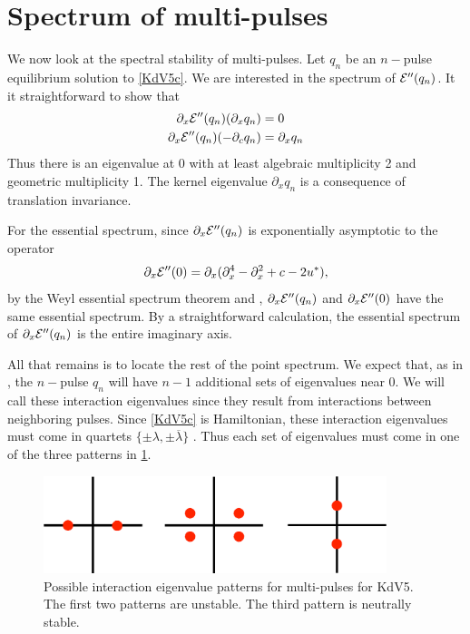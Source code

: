 \documentclass[thesis.tex]{subfiles}
\begin{document}
\section{Spectrum of multi-pulses}

We now look at the spectral stability of multi-pulses. Let $q_n$ be an $n-$pulse equilibrium solution to \cref{KdV5c}. We are interested in the spectrum of $\mathcal{E}''(q_n)$. It it straightforward to show that 
\begin{align*}
\partial_x \mathcal{E}''(q_n) (\partial_x q_n) &= 0 \\
\partial_x \mathcal{E}''(q_n) (-\partial_c q_n) &= \partial_x q_n
\end{align*}
Thus there is an eigenvalue at 0 with at least algebraic multiplicity 2 and geometric multiplicity 1. The kernel eigenvalue $\partial_x q_n$ is a consequence of translation invariance.

For the essential spectrum, since $\partial_x \mathcal{E}''(q_n)$ is exponentially asymptotic to the operator 
\[
\partial_x \mathcal{E}''(0) = 
\partial_x(\partial_x^4 - \partial_x^2 + c - 2 u^*),
\]
by the Weyl essential spectrum theorem \cite[Theorem 2.2.6]{Kapitula2013} and \cite[Theorem 3.1.11]{Kapitula2013}, $\partial_x \mathcal{E}''(q_n)$ and $\partial_x \mathcal{E}''(0)$ have the same essential spectrum. By a straightforward calculation, the essential spectrum of $\partial_x \mathcal{E}''(q_n)$ is the entire imaginary axis.

All that remains is to locate the rest of the point spectrum. We expect that, as in \cite{Sandstede1998}, the $n-$pulse $q_n$ will have $n-1$ additional sets of eigenvalues near 0. We will call these interaction eigenvalues since they result from interactions between neighboring pulses. Since \cref{KdV5c} is Hamiltonian, these interaction eigenvalues must come in quartets $\{ \pm \lambda, \pm \overline{\lambda}\}$ \cite[Proposition 5.1.2]{Kapitula2013}. Thus each set of eigenvalues must come in one of the three patterns in \cref{fig:kdv5inteigpattern}.

\begin{figure}[H]
\includegraphics[width=10cm]{images/kdv5/eigdouble2}
\caption{Possible interaction eigenvalue patterns for multi-pulses for KdV5. The first two patterns are unstable. The third pattern is neutrally stable.}
\label{fig:kdv5inteigpattern}
\end{figure}
\end{document}
